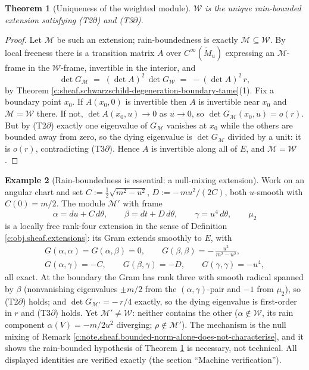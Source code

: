 \documentclass[11pt]{article}
\newtheorem{theorem}{Theorem}[section]
\theoremstyle{definition}
\newtheorem{example}[theorem]{Example}
\theoremstyle{plain}
\providecommand{\Mt}{}\renewcommand{\Mt}{\widetilde{M}}
\providecommand{\dtPG}{}\renewcommand{\dtPG}{dt}
\providecommand{\shW}{}\renewcommand{\shW}{\mathcal{W}}
\begin{document}
\begin{theorem}[Uniqueness of the weighted module]\label{c:sheaf.uniqueness-weighted-module}
$\shW$ is the unique rain-bounded extension satisfying (T2$\partial$) and (T3$\partial$).
\end{theorem}
\begin{proof}
Let $\mathcal{M}$ be such an extension; rain-boundedness is exactly $\mathcal{M} \subseteq \shW$. By local freeness there is a transition matrix $A$ over $C^\infty(\Mt_u)$ expressing an $\mathcal{M}$-frame in the $\shW$-frame, invertible in the interior, and
\[
\det G_{\mathcal{M}} \;=\; (\det A)^2 \,\det G_{\shW} \;=\; -(\det A)^2\, r ,
\]
by Theorem \ref{c:sheaf.schwarzschild-degeneration-boundary-tame}(1). Fix a boundary point $x_0$. If $A(x_0, 0)$ is invertible then $A$ is invertible near $x_0$ and $\mathcal{M} = \shW$ there. If not, $\det A(x_0, u) \to 0$ as $u \to 0$, so $\det G_{\mathcal{M}}(x_0, u) = o(r)$. But by (T2$\partial$) exactly one eigenvalue of $G_{\mathcal{M}}$ vanishes at $x_0$ while the others are bounded away from zero, so the dying eigenvalue is $\det G_{\mathcal{M}}$ divided by a unit: it is $o(r)$, contradicting (T3$\partial$). Hence $A$ is invertible along all of $E$, and $\mathcal{M} = \shW$.

\end{proof}

\begin{example}[Rain-boundedness is essential: a null-mixing extension]\label{c:note.sheaf.rain-boundedness-essential-null-mixing-extension}
Work on an angular chart and set $C := \tfrac12\sqrt{m^2 - u^2}$, $D := -\,m u^2/(2C)$, both $u$-smooth with $C(0) = m/2$. The module $\mathcal{M}'$ with frame
\[
\alpha = du + C\,d\theta, \qquad \beta = \dtPG + D\,d\theta, \qquad \gamma = u^4\,d\theta, \qquad \mu_2
\]
is a locally free rank-four extension in the sense of Definition \ref{c:obj.sheaf.extensions}: its Gram extends smoothly to $E$, with
\[
\begin{gathered} G(\alpha,\alpha) = G(\alpha,\beta) = 0, \qquad G(\beta,\beta) = -\,\frac{u^2}{m^2 - u^2}, \\ G(\alpha,\gamma) = -C, \qquad G(\beta,\gamma) = -D, \qquad G(\gamma,\gamma) = -u^4 , \end{gathered}
\]
all exact. At the boundary the Gram has rank three with smooth radical spanned by $\beta$ (nonvanishing eigenvalues $\pm m/2$ from the $(\alpha,\gamma)$-pair and $-1$ from $\mu_2$), so (T2$\partial$) holds; and $\det G_{\mathcal{M}'} = -\,r/4$ exactly, so the dying eigenvalue is first-order in $r$ and (T3$\partial$) holds. Yet $\mathcal{M}' \neq \shW$: neither contains the other ($\alpha \notin \shW$, its rain component $\alpha(V) = -m/2u^2$ diverging; $\rho \notin \mathcal{M}'$). The mechanism is the null mixing of Remark \ref{c:note.sheaf.bounded-norm-alone-does-not-characterise}, and it shows the rain-bounded hypothesis of Theorem \ref{c:sheaf.uniqueness-weighted-module} is necessary, not technical. All displayed identities are verified exactly (the section ``Machine verification'').
\end{example}
\end{document}
